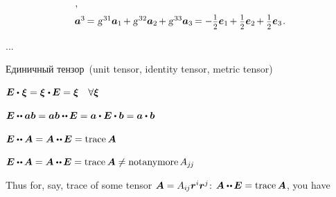 \begin{otherlanguage}{russian}
\begin{tcolorbox}
\[\begin{array}{l}
\hspace{.1ex} ,
\\[.5em]
%
\bm{a}^3 \hspace{-0.2ex}=\hspace{.1ex} \textsl{g}^{\hspace{.2ex}31} \bm{a}_1 \hspace{-0.2ex} + \textsl{g}^{\hspace{.2ex}32} \bm{a}_2 \hspace{-0.2ex} + \textsl{g}^{\hspace{.2ex}33} \bm{a}_3 \hspace{-0.2ex} = - \smalldisplaystyleonehalf \bm{e}_1 \hspace{-0.2ex} + \smalldisplaystyleonehalf \bm{e}_2 \hspace{-0.2ex} + \smalldisplaystyleonehalf \bm{e}_3
\hspace{.16ex} .
\end{array}\]

\par\end{tcolorbox}

...


Единичный тензор~(unit tensor, identity tensor,  metric tensor)

$\UnitDyad \dotp \hspace{.1ex} \bm{\xi} = \bm{\xi} \hspace{.1ex} \dotp \hspace{-0.12ex} \UnitDyad = \bm{\xi} \quad \forall \bm{\xi}$

$\UnitDyad \dotdotp \bm{a} \bm{b} = \bm{a} \bm{b} \dotdotp \hspace{-0.12ex} \UnitDyad = \bm{a} \dotp \UnitDyad \dotp \bm{b} = \bm{a} \dotp \bm{b}$

$\UnitDyad \dotdotp \bm{A} = \bm{A} \dotdotp \hspace{-0.12ex} \UnitDyad = \trace{\hspace{-0.1ex}\bm{A}}$

$\UnitDyad \dotdotp \hspace{-0.1ex} \bm{A} = \bm{A} \dotdotp \hspace{-0.12ex} \UnitDyad = \trace{\hspace{-0.1ex}\bm{A}} \neq \operatorname{not anymore} A_{j\hspace{-0.12ex}j}$

Thus for, say, trace of some tensor ${\bm{A} = A_{i\hspace{-0.1ex}j} \bm{r}^i \bm{r}^j}$: ${\bm{A} \dotdotp \hspace{-0.12ex} \UnitDyad = \trace{\hspace{-0.1ex}\bm{A}}}$, you have


\end{otherlanguage}
